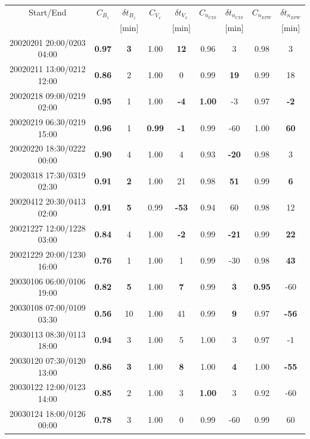 \documentclass[linenumbers,draft]{agujournal}
\begin{document}
\begin{table}[h]
\setlength{\tabcolsep}{3pt}
\centering
\begin{tabular}{c||cc|cc|cc|cc}
\hline
Start/End & $C_{B_{z}}$ & $\delta t_{B_{z}}$ & $C_{V_{x}}$ & $\delta t_{V_{x}}$ & $C_{n_{CIS}}$ & $\delta t_{n_{CIS}}$ & $C_{n_{EFW}}$ & $\delta t_{n_{EFW}}$ \\
& & [min] & & [min] & & [min] & & [min] \\
\hline
20020201 20:00/0203 04:00 & \textbf{0.97} & \textbf{3} & 1.00 & \textbf{12} & 0.96 & 3 & 0.98 & 3 \\
20020211 13:00/0212 12:00 & \textbf{0.86} & 2 & 1.00 & 0 & 0.99 & \textbf{19} & 0.99 & 18 \\
20020218 09:00/0219 02:00 & \textbf{0.95} & 1 & 1.00 & \textbf{-4} & \textbf{1.00} & -3 & 0.97 & \textbf{-2} \\
20020219 06:30/0219 15:00 & \textbf{0.96} & 1 & \textbf{0.99} & \textbf{-1} & 0.99 & -60 & 1.00 & \textbf{60} \\
20020220 18:30/0222 00:00 & \textbf{0.90} & 4 & 1.00 & 4 & 0.93 & \textbf{-20} & 0.98 & 3 \\
20020318 17:30/0319 02:30 & \textbf{0.91} & \textbf{2} & 1.00 & 21 & 0.98 & \textbf{51} & 0.99 & \textbf{6} \\
20020412 20:30/0413 02:00 & \textbf{0.91} & \textbf{5} & 0.99 & \textbf{-53} & 0.94 & 60 & 0.98 & 12 \\
20021227 12:00/1228 03:00 & \textbf{0.84} & 4 & 1.00 & \textbf{-2} & 0.99 & \textbf{-21} & 0.99 & \textbf{22} \\
20021229 20:00/1230 16:00 & \textbf{0.76} & 1 & 1.00 & 1 & 0.99 & -30 & 0.98 & \textbf{43} \\
20030106 06:00/0106 19:00 & \textbf{0.82} & \textbf{5} & 1.00 & \textbf{7} & 0.99 & \textbf{3} & \textbf{0.95} & -60 \\
20030108 07:00/0109 03:30 & \textbf{0.56} & 10 & 1.00 & 41 & 0.99 & \textbf{9} & 0.97 & \textbf{-56} \\
20030113 08:30/0113 18:00 & \textbf{0.94} & 3 & 1.00 & 5 & 1.00 & 3 & 0.97 & -1 \\
20030120 07:30/0120 13:00 & \textbf{0.86} & \textbf{3} & 1.00 & \textbf{8} & 1.00 & \textbf{4} & 1.00 & \textbf{-55} \\
20030122 12:00/0123 14:00 & \textbf{0.85} & 2 & 1.00 & 3 & \textbf{1.00} & 3 & 0.92 & -60 \\
20030124 18:00/0126 00:00 & \textbf{0.78} & 3 & 1.00 & 0 & 0.99 & -60 & 0.99 & 60 \\

\end{tabular}
\end{table}
\end{document}
